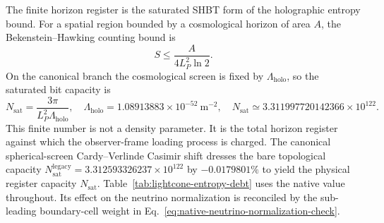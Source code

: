 \documentclass[11pt,letterpaper]{article}
\theoremstyle{plain}
\newcommand{\Lholo}{\Lambda_{\text{holo}}}
\newcommand{\Nsat}{N_{\text{sat}}}
\newcommand{\Lp}{L_P}
\begin{document}
The finite horizon register is the saturated SHBT form of the holographic
entropy bound.  For a spatial region bounded by a cosmological horizon of area
\(A\), the Bekenstein--Hawking counting bound is
\begin{equation}
\label{eq:holographic-entropy-bound-section-nine}
 S\le \frac{A}{4\Lp^2\ln2}.
\end{equation}
On the canonical branch the cosmological screen is fixed by \(\Lholo\), so the
saturated bit capacity is
\begin{equation}
\label{eq:cosmology-finite-register}
 \Nsat
 =
 \frac{3\pi}{\Lp^2\Lholo},
 \quad
 \Lholo=1.08913883\times10^{-52}\ \mathrm{m}^{-2},
 \quad
 \Nsat\simeq3.311997720142366\times10^{122}.
\end{equation}
This finite number is not a density parameter.  It is the total horizon
register against which the observer-frame loading process is charged.
The canonical spherical-screen Cardy--Verlinde Casimir shift dresses the bare topological capacity \(N_{\text{sat}}^{\text{legacy}} = 3.312593326237\times10^{122}\) by \(-0.0179801\%\) to yield the physical register capacity \(\Nsat\).  Table~\ref{tab:lightcone-entropy-debt} uses the native
value throughout.  Its effect on the neutrino normalization is reconciled by
the sub-leading boundary-cell weight in
Eq.~\eqref{eq:native-neutrino-normalization-check}.
\end{document}
